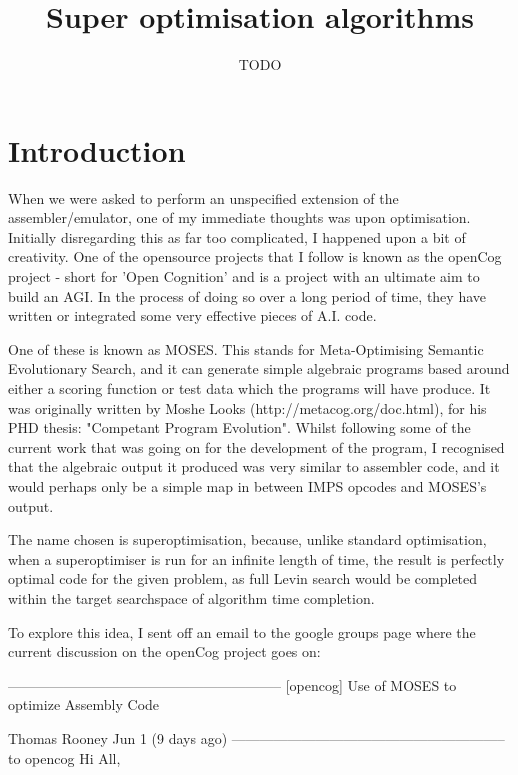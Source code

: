\documentclass[11pt]{article}
\begin{document}
\title{Super optimisation algorithms}
\author{TODO}

\maketitle

\section{Introduction}

When we were asked to perform an unspecified extension of the assembler/emulator, one of my immediate thoughts was upon optimisation. Initially disregarding this as far too complicated, I happened upon a bit of creativity. One of the opensource projects that I follow is known as the openCog project - short for 'Open Cognition' and is a project with an ultimate aim to build an AGI. In the process of doing so over a long period of time, they have written or integrated some very effective pieces of A.I. code. 

One of these is known as MOSES. This stands for Meta-Optimising Semantic Evolutionary Search, and it can generate simple algebraic programs based around either a scoring function or test data which the programs will have produce. It was originally written by Moshe Looks (http://metacog.org/doc.html), for his PHD thesis: "Competant Program Evolution". Whilst following some of the current work that was going on for the development of the program, I recognised that the algebraic output it produced was very similar to assembler code, and it would perhaps only be a simple map in between IMPS opcodes and MOSES's output. 

The name chosen is superoptimisation, because, unlike standard optimisation, when a superoptimiser is run for an infinite length of time, the result is perfectly optimal code for the given problem, as full Levin search would be completed within the target searchspace of algorithm time completion.

To explore this idea, I sent off an email to the google groups page where the current discussion on the openCog project goes on:

-----------------------------------------------------------
[opencog] Use of MOSES to optimize Assembly Code

Thomas Rooney
Jun 1 (9 days ago)
-----------------------------------------------------------
to opencog 
Hi All,
\end{document}
